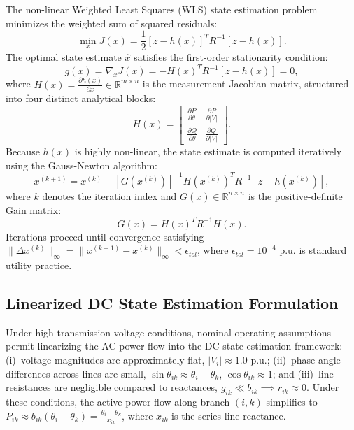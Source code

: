 \documentclass[journal,compsoc]{IEEEtran}
\begin{document}
The non-linear Weighted Least Squares (WLS) state estimation problem minimizes the weighted sum of squared residuals:
\begin{equation}
    \min_{x} J(x) = \frac{1}{2} [z - h(x)]^T R^{-1} [z - h(x)].
\end{equation}
The optimal state estimate $\hat{x}$ satisfies the first-order stationarity condition:
\begin{equation}
    g(x) = \nabla_x J(x) = -H(x)^T R^{-1} [z - h(x)] = 0,
\end{equation}
where $H(x) = \frac{\partial h(x)}{\partial x} \in \mathbb{R}^{m \times n}$ is the measurement Jacobian matrix, structured into four distinct analytical blocks:
\begin{equation}
    H(x) = 
    \begin{bmatrix}
        \frac{\partial P}{\partial \theta} & \frac{\partial P}{\partial |V|} \\
        \frac{\partial Q}{\partial \theta} & \frac{\partial Q}{\partial |V|}
    \end{bmatrix}.
\end{equation}
Because $h(x)$ is highly non-linear, the state estimate is computed iteratively using the Gauss-Newton algorithm:
\begin{equation}
    x^{(k+1)} = x^{(k)} + [G(x^{(k)})]^{-1} H(x^{(k)})^T R^{-1} [z - h(x^{(k)})],
\end{equation}
where $k$ denotes the iteration index and $G(x) \in \mathbb{R}^{n \times n}$ is the positive-definite Gain matrix:
\begin{equation}
    G(x) = H(x)^T R^{-1} H(x).
\end{equation}
Iterations proceed until convergence satisfying $\|\Delta x^{(k)}\|_\infty = \|x^{(k+1)} - x^{(k)}\|_\infty < \epsilon_{tol}$, where $\epsilon_{tol} = 10^{-4}\text{ p.u.}$ is standard utility practice.

\subsection{Linearized DC State Estimation Formulation}
Under high transmission voltage conditions, nominal operating assumptions permit linearizing the AC power flow into the DC state estimation framework: (i)~voltage magnitudes are approximately flat, $|V_i| \approx 1.0\text{ p.u.}$; (ii)~phase angle differences across lines are small, $\sin \theta_{ik} \approx \theta_i - \theta_k$, $\cos \theta_{ik} \approx 1$; and (iii)~line resistances are negligible compared to reactances, $g_{ik} \ll b_{ik} \implies r_{ik} \approx 0$. Under these conditions, the active power flow along branch $(i, k)$ simplifies to $P_{ik} \approx b_{ik} (\theta_i - \theta_k) = \frac{\theta_i - \theta_k}{x_{ik}}$, where $x_{ik}$ is the series line reactance.
\end{document}
